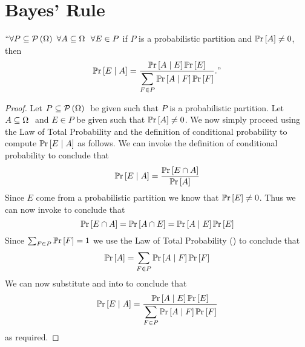     \section{Bayes' Rule}
        \begin{theorem}
            $``\forall P \subseteq \mathcal{P}\left(\Omega\right) \  \forall A \subseteq \Omega \  \ \forall E \in P$
            if $P$ is a probabilistic partition and $\mathbb{P}\mathrm{r} \left[A\right] \neq 0$, then 
            \[
                \mathbb{P}\mathrm{r}\left[E \mid A\right] = \dfrac{\mathbb{P}\mathrm{r}\left[A \mid E\right] \mathbb{P}\mathrm{r} \left[E\right]}{\displaystyle\sum_{F \in P} \mathbb{P}\mathrm{r}\left[A \mid F\right] \mathbb{P}\mathrm{r} \left[F\right]}."
            \]
        \end{theorem}
        \begin{proof}
            Let $P \subseteq \mathcal{P}\left(\Omega\right) \ $ be given such that $P$ is a probabilistic partition.
            Let $A \subseteq \Omega \ $ and $E \in P$ be given such that $\mathbb{P}\mathrm{r} \left[A\right] \neq 0$. We 
            now simply proceed using  the Law of Total Probability and the definition of
            conditional probability to compute $\mathbb{P}\mathrm{r}\left[E \mid A\right]$ as follows. We can 
            invoke the definition of conditional probability to conclude that
            \begin{equation}
                \mathbb{P}\mathrm{r}\left[E \mid A\right] = \frac{\mathbb{P}\mathrm{r} \left[E \cap A\right]}{\mathbb{P}\mathrm{r} \left[A\right]}
                \label{Baye's Rule equation 1}
            \end{equation}
            Since $E$ come from a probabilistic partition we know that $\mathbb{P}\mathrm{r} \left[E\right] \neq 0$.
            Thus we can now invoke  to conclude that
            \begin{equation}
                \mathbb{P}\mathrm{r} \left[E \cap A\right] = \mathbb{P}\mathrm{r} \left[A \cap E\right] = \mathbb{P}\mathrm{r}\left[A \mid E\right] \mathbb{P}\mathrm{r} \left[E\right]
                \label{Baye's Rule equation 3}
            \end{equation}
            Since $\sum_{F \in P} \mathbb{P}\mathrm{r} \left[F\right] = 1$ we use the Law of Total Probability
            () to conclude that
            \begin{equation}
                \mathbb{P}\mathrm{r} \left[A\right] = \sum_{F \in P} \mathbb{P}\mathrm{r}\left[A \mid F\right] \mathbb{P}\mathrm{r} \left[F\right]
                \label{Baye's Rule equation 4}
            \end{equation}
            We can now substitute 
            and  into 
            to conclude that
            \[
                \mathbb{P}\mathrm{r}\left[E \mid A\right] = \frac{\mathbb{P}\mathrm{r}\left[A \mid E\right] \mathbb{P}\mathrm{r} \left[E\right]}{\displaystyle\sum_{F \in P} \mathbb{P}\mathrm{r}\left[A \mid F\right] \mathbb{P}\mathrm{r} \left[F\right]}
            \]
            as required. \QED
        \end{proof}
